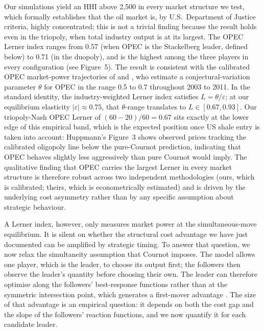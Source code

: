 Our simulations yield an HHI above 2,500 in every market structure we
test, which formally establishes that the oil market is, by U.S.\
Department of Justice criteria, highly concentrated; this is not a
trivial finding because the result holds even in the triopoly, when
total industry output is at its largest. The OPEC Lerner index ranges
from 0.57 (when OPEC is the Stackelberg leader, defined below) to 0.71
(in the duopoly), and is the highest among the three players in every
configuration (see Figure~5). The result is consistent with the
calibrated OPEC market-power trajectories of \citet{huppmannholz2012}
and \citet{huppmann2013}, who estimate a conjectural-variation parameter
$\theta$ for OPEC in the range 0.5 to 0.7 throughout 2003 to 2011. In
the standard \citet{bresnahan1989} identity, the industry-weighted
Lerner index satisfies $L = \theta/\varepsilon$; at our equilibrium
elasticity $|\varepsilon| \approx 0.75$, that $\theta$-range translates
to $L \in [0.67, 0.93]$. Our triopoly-Nash OPEC Lerner of
$(60-20)/60 = 0.67$ sits exactly at the lower edge of this empirical
band, which is the expected position once US shale entry is taken into
account: Huppmann's Figure~3 shows observed prices tracking the
calibrated oligopoly line below the pure-Cournot prediction, indicating
that OPEC behaves slightly less aggressively than pure Cournot would
imply. The qualitative finding that OPEC carries the largest Lerner in
every market structure is therefore robust across two independent
methodologies (ours, which is calibrated; theirs, which is
econometrically estimated) and is driven by the underlying cost
asymmetry rather than by any specific assumption about strategic
behaviour.

A Lerner index, however, only measures market power at the
simultaneous-move equilibrium. It is silent on whether the structural
cost advantage we have just documented can be amplified by strategic
timing. To answer that question, we now relax the simultaneity
assumption that Cournot imposes. The \citet[p.~??]{stackelberg1934} model
\citep[on whose original formulation see][]{baumgartner2001}
allows one player, which is the leader, to choose its output first; the
followers then observe the leader's quantity before choosing their own.
The leader can therefore optimise along the followers' best-response
functions rather than at the symmetric intersection point, which
generates a first-mover advantage \citep{dixit1980}\citep[p.~??]{tirole1988}. The size
of that advantage is an empirical question: it depends on both the cost
gap and the slope of the followers' reaction functions, and we now
quantify it for each candidate leader.

